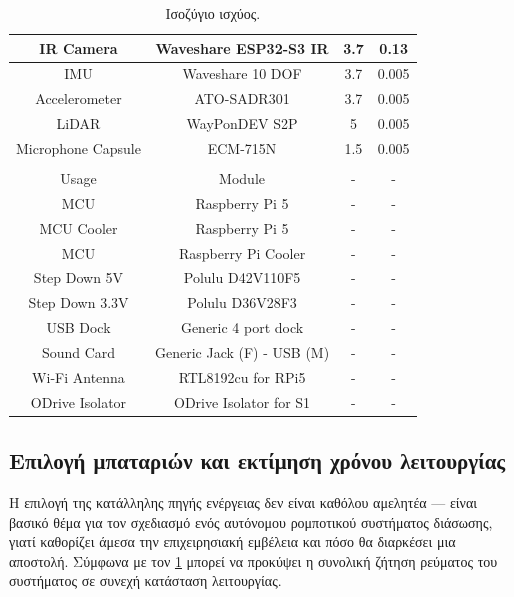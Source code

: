 \begin{table}[H]
\begin{tabular}{|c|c|c|c|}
        \hline
        IR Camera & Waveshare ESP32-S3 IR & 3.7 & 0.13 \\
        \hline
        IMU & Waveshare 10 DOF & 3.7 & 0.005 \\
        \hline
        Accelerometer & ATO-SADR301 & 3.7 & 0.005 \\
        \hline
        LiDAR & WayPonDEV S2P & 5 & 0.005\\
        \hline
        Microphone Capsule & ECM-715N & 1.5 & 0.005 \\
        \hline
        \rowcolor{Periwinkle}
        \multicolumn{4}{|c|}{Rest}\\
        \hline
        \rowcolor{Dandelion}
        Usage & Module & - & -\\
        \hline
        MCU & Raspberry Pi 5 & - & -\\
        \hline
        MCU Cooler & Raspberry Pi 5 & - & -\\
        \hline
        MCU & Raspberry Pi Cooler & - & -\\
        \hline
        Step Down 5V & Polulu D42V110F5 & - & -\\
        \hline
        Step Down 3.3V & Polulu D36V28F3 & - & -\\
        \hline
        USB Dock & Generic 4 port dock & - & -\\
        \hline
        Sound Card & Generic Jack (F) - USB (M) & - & -\\
        \hline
        Wi-Fi Antenna & RTL8192cu for RPi5 & - & -\\
        \hline
        ODrive Isolator & ODrive Isolator for S1 & - & -\\
        \hline

        \end{tabular}
    \caption{Ισοζύγιο ισχύος.}
    \label{tab:powerbudget}
\end{table}




\subsection{Επιλογή μπαταριών και εκτίμηση χρόνου λειτουργίας}

Η​‍​‌‍​‍‌ επιλογή της κατάλληλης πηγής ενέργειας δεν είναι καθόλου αμελητέα — είναι βασικό θέμα για τον σχεδιασμό ενός αυτόνομου ρομποτικού συστήματος διάσωσης, γιατί καθορίζει άμεσα την επιχειρησιακή εμβέλεια και πόσο θα διαρκέσει μια αποστολή. Σύμφωνα με τον \ref{tab:powerbudget} μπορεί να προκύψει η συνολική ζήτηση ρεύματος του συστήματος σε συνεχή κατάσταση λειτουργίας.


